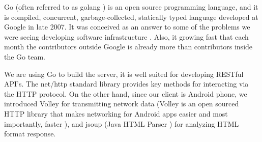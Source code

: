 Go (often referred to as golang \parencite{google.golang.2016}) is an open source programming language, and it is compiled, concurrent, garbage-collected, statically typed language developed at Google in late 2007. It was conceived as an answer to some of the problems we were seeing developing software infrastructure \parencite{google.talk-golang.2012}. Also, it growing fast that each month the contributors outside Google is already more than contributors inside the Go team. 

We are using Go to build the server, it is well suited for developing RESTful API’s. The net/http standard library provides key methods for interacting via the HTTP protocol. On the other hand, since our client is Android phone, we introduced Volley for transmitting network data (Volley is an open sourced HTTP library that makes networking for Android apps easier and most importantly, faster \parencite{google.volley.2016}), and jsoup (Java HTML Parser \parencite{joup.2016}) for analyzing HTML format response.

